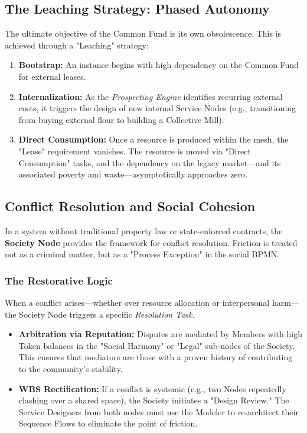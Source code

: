 \subsection{The Leaching Strategy: Phased Autonomy}
The ultimate objective of the Common Fund is its own obsolescence. This is achieved through a "Leaching" strategy:
\begin{enumerate}
    \item \textbf{Bootstrap:} An instance begins with high dependency on the Common Fund for external leases.
    \item \textbf{Internalization:} As the \textit{Prospecting Engine} identifies recurring external costs, it triggers the design of new internal Service Nodes (e.g., transitioning from buying external flour to building a Collective Mill).
    \item \textbf{Direct Consumption:} Once a resource is produced within the mesh, the "Lease" requirement vanishes. The resource is moved via "Direct Consumption" tasks, and the dependency on the legacy market—and its associated poverty and waste—asymptotically approaches zero.
\end{enumerate}

\subsection{Conflict Resolution and Social Cohesion}
In a system without traditional property law or state-enforced contracts, the \textbf{Society Node} provides the framework for conflict resolution. Friction is treated not as a criminal matter, but as a "Process Exception" in the social BPMN.

\subsubsection{The Restorative Logic}
When a conflict arises—whether over resource allocation or interpersonal harm—the Society Node triggers a specific \textit{Resolution Task}. 
\begin{itemize}[leftmargin=*]
    \item \textbf{Arbitration via Reputation:} Disputes are mediated by Members with high Token balances in the "Social Harmony" or "Legal" sub-nodes of the Society. This ensures that mediators are those with a proven history of contributing to the community’s stability.
    \item \textbf{WBS Rectification:} If a conflict is systemic (e.g., two Nodes repeatedly clashing over a shared space), the Society initiates a "Design Review." The Service Designers from both nodes must use the Modeler to re-architect their Sequence Flows to eliminate the point of friction.
\end{itemize}

